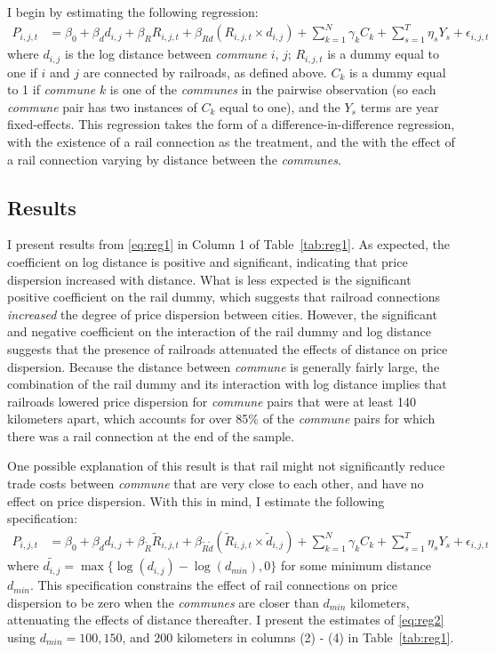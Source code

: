 \documentclass[12pt,twoside]{article}
\begin{document}
I begin by estimating the following regression:
\begin{align}
	P_{i,j,t} &= \beta_0 + \beta_d d_{i,j} + \beta_R R_{i,j,t} + \beta_{Rd} (R_{i,j,t} \times d_{i,j}) + \sum_{k=1}^{N} \gamma_k C_k + \sum_{s=1}^{T} \eta_s Y_s + \epsilon_{i,j,t} \label{eq:reg1}
\end{align}
where $d_{i,j}$ is the log distance between \emph{commune} $i$, $j$; $R_{i,j,t}$ is a dummy equal to one if $i$ and $j$ are connected by railroads, as defined above.
$C_k$ is a dummy equal to 1 if \emph{commune} $k$ is one of the \emph{communes} in the pairwise observation (so each \emph{commune} pair has two instances of $C_k$ equal to one), and the $Y_s$ terms are year fixed-effects.
This regression takes the form of a difference-in-difference regression, with the existence of a rail connection as the treatment, and the with the effect of a rail connection varying by distance between the \emph{communes}.

\subsection{Results}

I present results from \eqref{eq:reg1} in Column 1 of Table~\ref{tab:reg1}.
As expected, the coefficient on log distance is positive and significant, indicating that price dispersion increased with distance.
What is less expected is the significant positive coefficient on the rail dummy, which suggests that railroad connections \emph{increased} the degree of price dispersion between cities.
However, the significant and negative coefficient on the interaction of the rail dummy and log distance suggests that the presence of railroads attenuated the effects of distance on price dispersion.
Because the distance between \emph{commune} is generally fairly large, the combination of the rail dummy and its interaction with log distance implies that railroads lowered price dispersion for \emph{commune} pairs that were at least 140 kilometers apart, which accounts for over 85\% of the \emph{commune} pairs for which there was a rail connection at the end of the sample.

One possible explanation of this result is that rail might not significantly reduce trade costs between \emph{commune} that are very close to each other, and have no effect on price dispersion.
With this in mind, I estimate the following specification:
\begin{align}
	P_{i,j,t} &= \beta_0 + \beta_d d_{i,j} + \beta_{\tilde{R}} \tilde{R}_{i,j,t} + \beta_{\tilde{R}\tilde{d}} (\tilde{R}_{i,j,t} \times \tilde{d}_{i,j}) + \sum_{k=1}^{N} \gamma_k C_k + \sum_{s=1}^{T} \eta_s Y_s + \epsilon_{i,j,t} \label{eq:reg2}
\end{align}
where $\tilde{d_{i,j}} = \max\{ \log( d_{i,j} ) - \log( d_{min} ), 0 \}$ for some minimum distance $d_{min}$.
This specification constrains the effect of rail connections on price dispersion to be zero when the \emph{communes} are closer than $d_{min}$ kilometers, attenuating the effects of distance thereafter.
I present the estimates of \eqref{eq:reg2} using $d_{min} = 100, 150$, and $200$ kilometers in columns (2) - (4) in Table~\ref{tab:reg1}.
\end{document}
